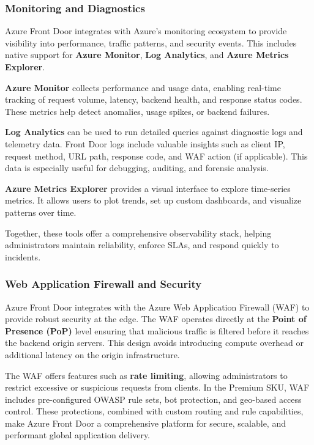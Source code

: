 \documentclass[12pt]{article}
\begin{document}
\subsubsection{Monitoring and Diagnostics}

Azure Front Door integrates with Azure's monitoring ecosystem to provide visibility into performance, traffic patterns, and security events. This includes native support for \textbf{Azure Monitor}, \textbf{Log Analytics}, and \textbf{Azure Metrics Explorer}.

\textbf{Azure Monitor} collects performance and usage data, enabling real-time tracking of request volume, latency, backend health, and response status codes. These metrics help detect anomalies, usage spikes, or backend failures.

\textbf{Log Analytics} can be used to run detailed queries against diagnostic logs and telemetry data. Front Door logs include valuable insights such as client IP, request method, URL path, response code, and WAF action (if applicable). This data is especially useful for debugging, auditing, and forensic analysis.

\textbf{Azure Metrics Explorer} provides a visual interface to explore time-series metrics. It allows users to plot trends, set up custom dashboards, and visualize patterns over time.

Together, these tools offer a comprehensive observability stack, helping administrators maintain reliability, enforce SLAs, and respond quickly to incidents.


\subsubsection{Web Application Firewall and Security}

Azure Front Door integrates with the Azure Web Application Firewall (WAF) to provide robust security at the edge. The WAF operates directly at the \textbf{Point of Presence (PoP)} level ensuring that malicious traffic is filtered before it reaches the backend origin servers. This design avoids introducing compute overhead or additional latency on the origin infrastructure.

The WAF offers features such as \textbf{rate limiting}, allowing administrators to restrict excessive or suspicious requests from clients. In the Premium SKU, WAF includes pre-configured OWASP rule sets, bot protection, and geo-based access control. These protections, combined with custom routing and rule capabilities, make Azure Front Door a comprehensive platform for secure, scalable, and performant global application delivery.

\clearpage
\end{document}
